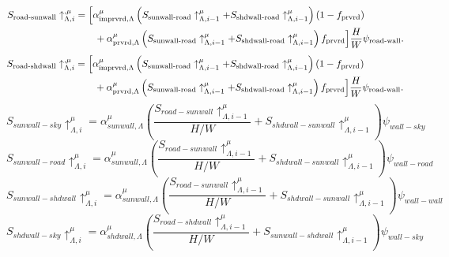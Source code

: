 \documentclass[12pt,authoryear]{elsarticle}
\numberwithin{equation}{section} %
\begin{document}
\begin{equation}
\begin{aligned}
S_{\mathrm{road\text{-}sunwall}}\uparrow_{\Lambda,i}^{,\mu}
&=\Bigl[\alpha_{\mathrm{imprvrd},\Lambda}^{\mu}\left(
S_{\mathrm{sunwall\text{-}road}}\uparrow_{\Lambda,i-1}^{\mu}+S_{\mathrm{shdwall\text{-}road}}\uparrow_{\Lambda,i-1}^{\mu}\right)(1-f_{\mathrm{prvrd}})\\
&\qquad+\alpha_{\mathrm{prvrd},\Lambda}^{\mu}\left(S_{\mathrm{sunwall\text{-}road}}\uparrow_{\Lambda,i-1}^{\mu}+S_{\mathrm{shdwall\text{-}road}}\uparrow_{\Lambda,i-1}^{\mu}\right)f_{\mathrm{prvrd}}\Bigr]\frac{H}{W}\psi_{\mathrm{road\text{-}wall}} .
\end{aligned}
\end{equation}
\begin{equation}
\begin{aligned}
S_{\mathrm{road\text{-}shdwall}}\uparrow_{\Lambda,i}^{,\mu}
&=\Bigl[\alpha_{\mathrm{imprvrd},\Lambda}^{\mu}\left(
S_{\mathrm{sunwall\text{-}road}}\uparrow_{\Lambda,i-1}^{\mu}+S_{\mathrm{shdwall\text{-}road}}\uparrow_{\Lambda,i-1}^{\mu}\right)(1-f_{\mathrm{prvrd}})\\
&\qquad+\alpha_{\mathrm{prvrd},\Lambda}^{\mu}\left(S_{\mathrm{sunwall\text{-}road}}\uparrow_{\Lambda,i-1}^{\mu}+S_{\mathrm{shdwall\text{-}road}}\uparrow_{\Lambda,i-1}^{\mu}\right)f_{\mathrm{prvrd}}\Bigr]\frac{H}{W}\psi_{\mathrm{road\text{-}wall}} .
\end{aligned}
\end{equation}
\begin{equation}
S_{sunwall-sky}\uparrow_{\Lambda,i}^{\mu}=\alpha_{sunwall,\Lambda}^{\mu}\left(\frac{S_{road-sunwall}\uparrow_{\Lambda,i-1}^{\mu}}{H/W}+S_{shdwall-sunwall}\uparrow_{\Lambda,i-1}^{\mu}\right)\psi_{wall-sky}
\end{equation}
\begin{equation}
S_{sunwall-road}\uparrow_{\Lambda,i}^{\mu}=\alpha_{sunwall,\Lambda}^{\mu}\left(\frac{S_{road-sunwall}\uparrow_{\Lambda,i-1}^{\mu}}{H/W}+S_{shdwall-sunwall}\uparrow_{\Lambda,i-1}^{\mu}\right)\psi_{wall-road}
\end{equation}
\begin{equation}
S_{sunwall-shdwall}\uparrow_{\Lambda,i}^{\mu}=\alpha_{sunwall,\Lambda}^{\mu}\left(\frac{S_{road-sunwall}\uparrow_{\Lambda,i-1}^{\mu}}{H/W}+S_{shdwall-sunwall}\uparrow_{\Lambda,i-1}^{\mu}\right)\psi_{wall-wall}
\end{equation}
\begin{equation}
S_{shdwall-sky}\uparrow_{\Lambda,i}^{\mu}=\alpha_{shdwall,\Lambda}^{\mu}\left(\frac{S_{road-shdwall}\uparrow_{\Lambda,i-1}^{\mu}}{H/W}+S_{sunwall-shdwall}\uparrow_{\Lambda,i-1}^{\mu}\right)\psi_{wall-sky}
\end{equation}
\end{document}
